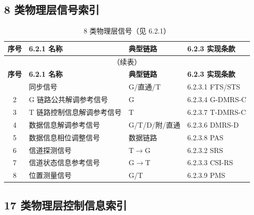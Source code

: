 \documentclass[11pt,a4paper]{ctexart}
\begin{document}
\subsection{8 类物理层信号索引}

\begin{longtable}{clll}
\caption{8 类物理层信号（见 6.2.1）} \\
\toprule
\textbf{序号} & \textbf{6.2.1 名称} & \textbf{典型链路} & \textbf{6.2.3 实现条款} \\
\midrule
\endfirsthead
\multicolumn{4}{c}{\small（续表）} \\
\toprule
\textbf{序号} & \textbf{6.2.1 名称} & \textbf{典型链路} & \textbf{6.2.3 实现条款} \\
\midrule
\endhead
\bottomrule
\endfoot
1 & 同步信号 & G/直通/T & 6.2.3.1 FTS/STS \\
2 & G 链路公共解调参考信号 & G & 6.2.3.4 G-DMRS-C \\
3 & T 链路控制信息解调参考信号 & T & 6.2.3.7 T-DMRS-C \\
4 & 数据信息解调参考信号 & G/T/D/附/直通 & 6.2.3.6 DMRS-D \\
5 & 数据信息相位调整信号 & 数据链路 & 6.2.3.8 PAS \\
6 & 信道探测信号 & T$\rightarrow$G & 6.2.3.2 SRS \\
7 & 信道状态信息参考信号 & G$\rightarrow$T & 6.2.3.3 CSI-RS \\
8 & 位置测量信号 & G/T & 6.2.3.9 PMS \\
\end{longtable}

\subsection{17 类物理层控制信息索引}
\end{document}
